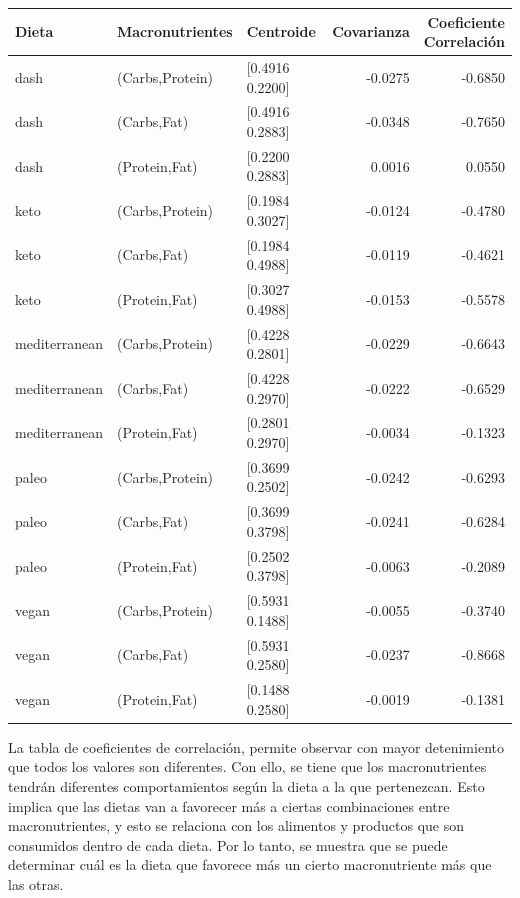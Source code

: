 \documentclass[12pt,a4paper]{article}
\begin{document}
{        \begin{center}
            \begin{tabular}{lllrr}
            \toprule
                Dieta & Macronutrientes & Centroide & Covarianza & \makecell{Coeficiente\\Correlación} \\
            \midrule
                dash          & (Carbs,Protein) & [0.4916 0.2200] & -0.0275 & -0.6850 \\
                dash          & (Carbs,Fat)     & [0.4916 0.2883] & -0.0348 & -0.7650 \\
                dash          & (Protein,Fat)   & [0.2200 0.2883] &  0.0016 &  0.0550 \\
                keto          & (Carbs,Protein) & [0.1984 0.3027] & -0.0124 & -0.4780 \\
                keto          & (Carbs,Fat)     & [0.1984 0.4988] & -0.0119 & -0.4621 \\
                keto          & (Protein,Fat)   & [0.3027 0.4988] & -0.0153 & -0.5578 \\
                mediterranean & (Carbs,Protein) & [0.4228 0.2801] & -0.0229 & -0.6643 \\
                mediterranean & (Carbs,Fat)     & [0.4228 0.2970] & -0.0222 & -0.6529 \\
                mediterranean & (Protein,Fat)   & [0.2801 0.2970] & -0.0034 & -0.1323 \\
                paleo         & (Carbs,Protein) & [0.3699 0.2502] & -0.0242 & -0.6293 \\
                paleo         & (Carbs,Fat)     & [0.3699 0.3798] & -0.0241 & -0.6284 \\
                paleo         & (Protein,Fat)   & [0.2502 0.3798] & -0.0063 & -0.2089 \\
                vegan         & (Carbs,Protein) & [0.5931 0.1488] & -0.0055 & -0.3740 \\
                vegan         & (Carbs,Fat)     & [0.5931 0.2580] & -0.0237 & -0.8668 \\
                vegan         & (Protein,Fat)   & [0.1488 0.2580] & -0.0019 & -0.1381 \\
            \bottomrule
            \end{tabular}
        \end{center}
        
        La tabla de coeficientes de correlación, 
        permite observar con mayor detenimiento que todos los valores son diferentes. Con 
        ello, se tiene que 
        los macronutrientes tendrán diferentes comportamientos según la dieta a la que 
        pertenezcan. Esto implica que las dietas van a favorecer más a ciertas combinaciones 
        entre macronutrientes, y esto se relaciona con los alimentos y productos que son 
        consumidos dentro de cada dieta. Por lo tanto, se 
        muestra que se puede determinar cuál es la dieta que favorece más un cierto macronutriente 
        más que las otras.
    }
\end{document}
